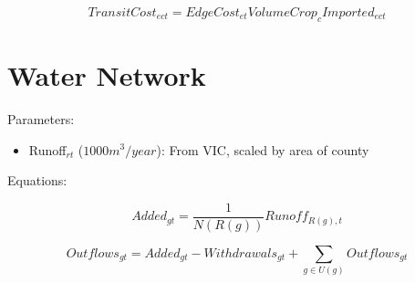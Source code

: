 \documentclass[11pt,oneside, landscape]{amsart}
\begin{document}
\[
TransitCost_{ect} = EdgeCost_{et} VolumeCrop_c Imported_{ect}
\]

\section{Water Network}

Parameters:

\begin{itemize}
\item Runoff$_{rt}$ ($1000 m^3 / year$): From VIC, scaled by area of county
\end{itemize}

Equations:

\[
Added_{gt} = \frac{1}{N(R(g))} Runoff_{R(g),t}
\]

\[
Outflows_{gt} = Added_{gt} - Withdrawals_{gt} + \sum_{g \in U(g)}
Outflows_{gt}
\]
\end{document}
